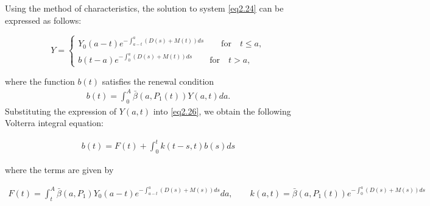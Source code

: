 \documentclass[10pt, a4paper]{amsart}
\makeatletter
\theoremstyle{plain}
\theoremstyle{definition}
\theoremstyle{remark}
\renewenvironment{proof}[1][\proofname]{\par
  \pushQED{\qed}%
  \normalfont \topsep6\p@\@plus6\p@\relax
  \trivlist
  \item[\hskip\labelsep
        \itshape
    #1\ \ref{#1}.]\ignorespaces
}{%
  \popQED\endtrivlist\@endpefalse
}
\numberwithin{equation}{section}
\makeatother
\begin{document}
\begin{proof}[of Theorem \ref{th2.7}]
Using the method of characteristics, the solution to system \eqref{eq2.24} can be expressed as follows:

\begin{equation}
Y=\left\lbrace\begin{array}{ll}
Y_{0}(a-t)e^{-\displaystyle\int_{a-t}^a(D(s)+M(t))ds}\qquad\text{for}\quad t\leq a,\\
b(t-a)e^{-\displaystyle\int_0^a(D(s)+M(t))ds}\qquad\text{for}\quad t> a,
\end{array}
\right.
\end{equation} 

where the function $b(t)$ satisfies the renewal condition
\begin{align}\label{eq2.26}
b(t)=\displaystyle\int_0^A\bar{\beta}(a,P_1(t))Y(a,t)da.
\end{align}
 Substituting the expression of $Y(a,t)$ into \eqref{eq2.26}, we obtain the following Volterra integral equation:

\begin{align}
b(t)=F(t)+\displaystyle\int_0^t k(t-s,t)b(s)ds  
\end{align}

where the terms are given by

\begin{align}
 F(t)=\displaystyle\int_t^A \bar{\beta}(a,P_1)Y_{0}(a-t)e^{-\displaystyle\int_{a-t}^a(D(s)+M(s))ds}da,\qquad k(a,t)=\bar{\beta}(a,P_1(t))e^{-\displaystyle\int_0^a(D(s)+M(s))ds}
\end{align}


\end{proof}
\end{document}
